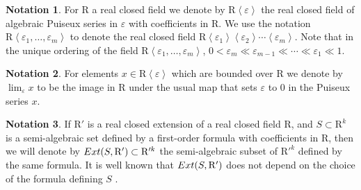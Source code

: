 \documentclass[10pt]{amsart}
\theoremstyle{definition}
\newtheorem{notation}{Notation}[section]
\theoremstyle{remark}
\numberwithin{equation}{section}
\newcommand {\R} {\mathrm{R}}
\newcommand {\eps} {{\varepsilon}}
\newcommand {\E} {{\rm Ext}}
\begin{document}
\begin{notation}
  For $\R$ a real closed field we denote by $\R \left\langle \eps
  \right\rangle$ the real closed field of algebraic Puiseux series in $\eps$
  with coefficients in $\R$. We use the notation $\R \left\langle \eps_{1},
  \ldots, \eps_{m} \right\rangle$ to denote the real closed field $\R
  \left\langle \eps_{1} \right\rangle \left\langle \eps_{2} \right\rangle
  \cdots \left\langle \eps_{m} \right\rangle$. Note that in the unique
  ordering of the field $\R \left\langle \eps_{1}, \ldots, \eps_{m}
  \right\rangle$, $0< \eps_{m} \ll \eps_{m-1} \ll \cdots \ll \eps_{1} \ll 1$.
\end{notation}

\begin{notation}
\label{not:lim}
  For elements $x \in \R \left\langle \eps \right\rangle$ which are bounded
  over $\R$ we denote by $\lim_{\eps}  x$ to be the image in $\R$ under the
  usual map that sets $\eps$ to $0$ in the Puiseux series $x$.
\end{notation}

\begin{notation}
\label{not:extension}
  If $\R'$ is a real closed extension of a real closed field $\R$, and $S
  \subset \R^{k}$ is a semi-algebraic set defined by a first-order formula
  with coefficients in $\R$, then we will denote by $\E(S, \R') \subset \R'^{k}$ the semi-algebraic subset of $\R'^{k}$ defined by
  the same formula.
 It is well known that $\E(S, \R')$ does
  not depend on the choice of the formula defining $S$ 
  \cite[Proposition 2.87]{BPRbook2}.
\end{notation}
\end{document}
